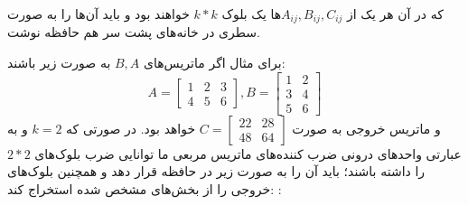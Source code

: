 \documentclass[12pt,onecolumn,a4paper,fleqn]{article}
\begin{document}
که در آن هر یک از $A_{ij} , B_{ij} , C_{ij}$ها یک بلوک $k*k$ خواهند بود و باید آن‌ها را به صورت سطری در خانه‌های پشت سر هم حافظه نوشت. 

\pagebreak
برای مثال اگر ماتریس‌های 
$B,A$ به صورت زیر باشند:
$$ A = \begin{bmatrix}
1& 2 & 3\\
4& 5 & 6
\end{bmatrix} , 
B = \begin{bmatrix}
1& 2 \\
3& 4 \\
5& 6
\end{bmatrix}
$$
و ماتریس خروجی به صورت 
$ C = \begin{bmatrix}
22& 28 \\
48& 64
\end{bmatrix}
 $
 خواهد بود. در صورتی که 
$k=2$
و به عبارتی واحد‌های درونی ضرب کننده‌های ماتریس مربعی ما توانایی ضرب بلوک‌های $2*2$ را داشته‌ باشند؛  باید آن را به صورت زیر در حافظه قرار دهد و همچنین بلوک‌های خروجی را از بخش‌های مشخص شده استخراج کند:
:
\end{document}
